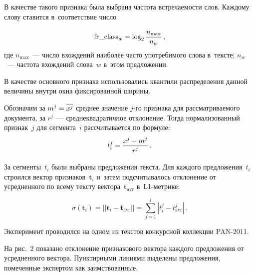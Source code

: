 \begin{multicols}{2}
В качестве такого признака была выбрана час\-то\-та встречаемости слов. Каждому 
слову ставится в~соответствие число

\noindent
\begin{equation}
  \label{1-saf}
  \text{fr\_class}_w = \log_2 \displaystyle\frac{\displaystyle n_{\max}\mathstrut}{\displaystyle n_w\mathstrut}\,,
\end{equation}
где $n_{\max}$~--- число вхождений наиболее часто употребимого слова в~тексте; 
$n_w$~--- частота вхождений слова~$w$ в~этом предложении.

В качестве основного признака использовались квантили распределения данной 
величины внутри окна фиксированной ширины.

Обозначим за $m^j \hm=\overline{x^j}$ среднее значение $j$-го признака для 
рассматриваемого документа, за $r^j$~--- среднеквадратичное отклонение. Тогда 
нормализованный признак~$j$ для сегмента~$i$ рассчитывается по формуле:
$$
t_i^j=\displaystyle\frac{\displaystyle x^j-m^j\mathstrut}{\displaystyle r^j\mathstrut}\,. 
$$

За сегменты~$t_i$ были выбраны предложения текс\-та. Для каждого предложения~$t_i$ 
строился вектор признаков~$\mathbf{t}_i$ и~затем подсчитывалось отклонение от 
усредненного по всему текс\-ту вектора~$\mathbf{t}_{\mathrm{avr}}$ в~L1-мет\-рике:

\vspace*{-2pt}  

  \noindent
\begin{equation}
  \sigma(\mathbf{t}_i)=||\mathbf{t}_i-\mathbf{t}_{\mathrm{avr}}|| = 
\sum\limits_{j=1}^l|t_i^j-t_{\mathrm{avr}}^j|\,.
  \label{2-saf}
\end{equation}

\vspace*{-2pt}

Эксперимент проводился на одном из текстов конкурсной коллекции PAN-2011.

На рис.~2 показано отклонение признакового вектора каждого предложения от 
усредненного вектора. Пунктирными линиями выделены предложения, помеченные 
экспертом как заимствованные.

\begin{figure*} %
    \vspace*{1pt}
\begin{center}
\mbox{%
\epsfxsize=160.138mm
}
\end{center}
\vspace*{-9pt}
\vspace*{-3pt}
\end{figure*}


\end{multicols}
